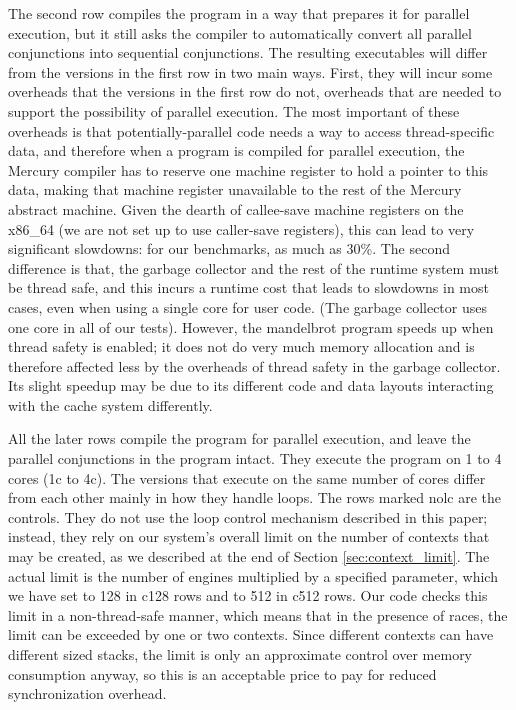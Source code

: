The second row
compiles the program in a way that prepares it for parallel execution,
but it still asks the compiler to automatically convert
all parallel conjunctions into sequential conjunctions.
The resulting executables will differ from the versions in the first row
in two main ways.
First, they will incur some overheads
that the versions in the first row do not,
overheads that are needed to support the possibility of parallel execution.
The most important of these overheads is that
potentially-parallel code needs a way to access thread-specific data,
and therefore when a program is compiled for parallel execution,
the Mercury compiler has to reserve one machine register
to hold a pointer to this data,
making that machine register unavailable
to the rest of the Mercury abstract machine.
Given the dearth of callee-save machine registers on the x86\_64
(we are not set up to use caller-save registers),
this can lead to very significant slowdowns:
for our benchmarks, as much as 30\%.
The second difference is that,
the garbage collector and the rest of the runtime system
must be thread safe,
and this incurs a runtime cost that leads to slowdowns in most cases,
even when using a single core for user code.
(The garbage collector uses one core in all of our tests).
However, the mandelbrot program speeds up when thread safety is enabled;
it does not do very much memory allocation
and is therefore affected less by
the overheads of thread safety in the garbage collector.
Its slight speedup may be due to
its different code and data layouts
interacting with the cache system differently.

All the later rows
compile the program for parallel execution,
and leave the parallel conjunctions in the program intact.
They execute the program on 1 to 4 cores (1c to 4c).
The versions that execute on the same number of cores
differ from each other mainly in how they handle loops.
The rows marked nolc are the controls.
They do not use the loop control mechanism described in this paper;
instead, they rely on our system's overall limit
on the number of contexts that may be created,
as we described at the end of Section \ref{sec:context_limit}.
The actual limit is the number of engines
multiplied by a specified parameter,
which we have set to 128 in c128 rows and to 512 in c512 rows.
Our code checks this limit in a non-thread-safe manner,
which means that in the presence of races,
the limit can be exceeded by one or two contexts.
Since different contexts can have different sized stacks,
the limit is only an approximate control over memory consumption anyway,
so this is an acceptable price to pay for reduced synchronization overhead.

